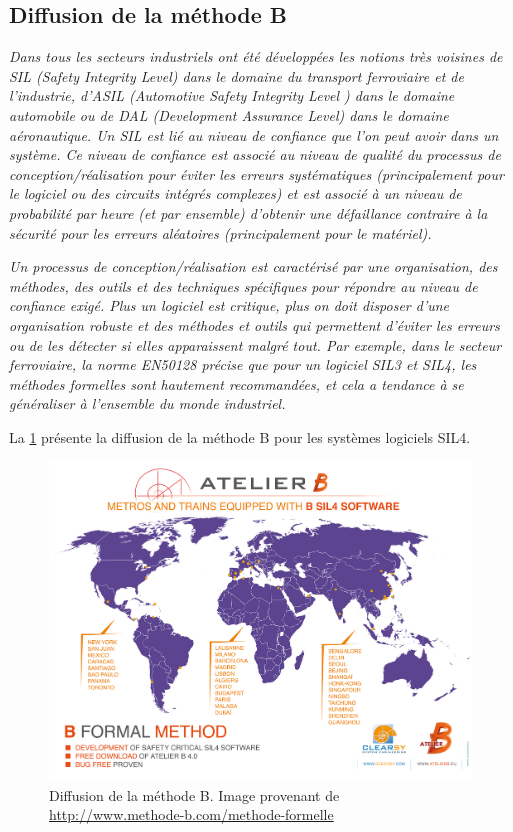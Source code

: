 \documentclass[10pt,a4paper]{article}
\begin{document}
\subsection{Diffusion de la méthode B}
\emph{Dans tous les secteurs industriels ont été développées les notions très voisines de SIL (Safety Integrity Level) dans le domaine du transport ferroviaire et de l’industrie, d’ASIL (Automotive Safety Integrity Level ) dans le domaine automobile ou de DAL (Development Assurance Level) dans le domaine aéronautique. Un SIL est lié au niveau de confiance que l'on peut avoir dans un système. Ce niveau de confiance est associé au niveau de qualité du processus de conception/réalisation pour éviter les erreurs systématiques (principalement pour le logiciel ou des circuits intégrés complexes) et est associé à un niveau de probabilité par heure (et par ensemble) d'obtenir une défaillance contraire à la sécurité pour les erreurs aléatoires (principalement pour le matériel).}\cite{dossierTechnique}

\emph{Un processus de conception/réalisation est caractérisé par une organisation, des méthodes, des outils et des techniques spécifiques pour répondre au niveau de confiance exigé. Plus un logiciel est critique, plus on doit disposer d'une organisation robuste et des méthodes et outils qui permettent d'éviter les erreurs ou de les détecter si elles apparaissent malgré tout. Par exemple, dans le secteur ferroviaire, la norme EN50128 précise que pour un logiciel SIL3 et SIL4, les méthodes formelles sont hautement recommandées, et cela a tendance à se généraliser à l'ensemble du monde industriel.}\cite{dossierTechnique}

La \cref{UtilisationB} présente la diffusion de la méthode B pour les systèmes logiciels SIL4.
\begin{figure}[h]
\centering
\includegraphics[scale=0.23]{ressources/carte-monde-projets-b.jpg}
\caption{\label{UtilisationB}Diffusion de la méthode B. Image provenant de \url{http://www.methode-b.com/methode-formelle}}
\end{figure}
\end{document}
